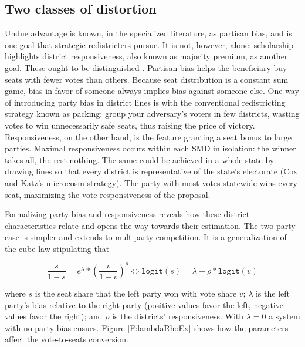 \documentclass[letter,12pt]{article}
\begin{document}
\subsection{Two classes of distortion}


Undue advantage is known, in the specialized literature, as partisan bias, and is one goal that strategic redistricters pursue. It is not, however, alone: scholarship highlights district responsiveness, also known as majority premium, as another goal. These ought to be distinguished \citep[this explication draws heavily on][, ch.\ 3]{cox.katz.2002}. Partisan bias helps the beneficiary buy seats with fewer votes than others. Because seat distribution is a constant sum game, bias in favor of someone always implies bias against someone else. One way of introducing party bias in district lines is with the conventional redistricting strategy known as packing: group your adversary's voters in few districts, wasting votes to win unnecessarily safe seats, thus raising the price of victory. Responsiveness, on the other hand, is the feature granting a seat bonus to large parties. Maximal responsiveness occurs within each SMD in isolation: the winner takes all, the rest nothing. The same could be achieved in a whole state by drawing lines so that every district is representative of the state's electorate (Cox and Katz's microcosm strategy). The party with most votes statewide wins every seat, maximizing the vote responsiveness of the proposal. 

Formalizing party bias and responsiveness reveals how these district characteristics relate and opens the way towards their estimation. The two-party case is simpler \citep{taagepera.CubeLaw.1973,tufte1973seatsVotes,king.browning1987biasRespUS} and extends to multiparty competition. It is a generalization of the cube law stipulating that 

\begin{equation}\label{E:kingBi}
 \frac{s}{1-s} = e^\lambda *  \left(\frac{v}{1-v}\right)^\rho \iff
 \texttt{logit}(s) = \lambda + \rho *  \texttt{logit}(v)
\end{equation}\label{E:cubeLaw}

\noindent where $s$ is the seat share that the left party won with vote share $v$; $\lambda$ is the left party's bias relative to the right party (positive values favor the left, negative values favor the right); and $\rho$ is the districts' responsiveness. With $\lambda=0$ a system with no party bias ensues. Figure \ref{F:lambdaRhoEx} shows how the parameters affect the vote-to-seats conversion. 
\end{document}
